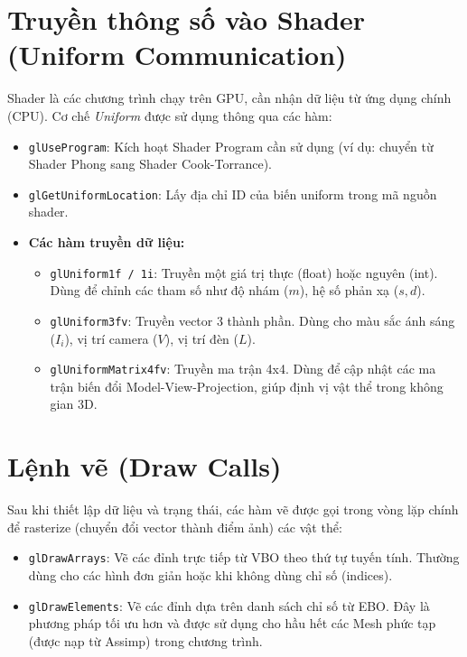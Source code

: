 \section{Truyền thông số vào Shader (Uniform Communication)}

Shader là các chương trình chạy trên GPU, cần nhận dữ liệu từ ứng dụng chính (CPU). Cơ chế \textit{Uniform} được sử dụng thông qua các hàm:

\begin{itemize}
	\item \texttt{glUseProgram}: Kích hoạt Shader Program cần sử dụng (ví dụ: chuyển từ Shader Phong sang Shader Cook-Torrance).
	\item \texttt{glGetUniformLocation}: Lấy địa chỉ ID của biến uniform trong mã nguồn shader.
	\item \textbf{Các hàm truyền dữ liệu:}
	\begin{itemize}
		\item \texttt{glUniform1f / 1i}: Truyền một giá trị thực (float) hoặc nguyên (int). Dùng để chỉnh các tham số như độ nhám ($m$), hệ số phản xạ ($s, d$).
		\item \texttt{glUniform3fv}: Truyền vector 3 thành phần. Dùng cho màu sắc ánh sáng ($I_i$), vị trí camera ($V$), vị trí đèn ($L$).
		\item \texttt{glUniformMatrix4fv}: Truyền ma trận 4x4. Dùng để cập nhật các ma trận biến đổi Model-View-Projection, giúp định vị vật thể trong không gian 3D.
	\end{itemize}
\end{itemize}

\section{Lệnh vẽ (Draw Calls)}

Sau khi thiết lập dữ liệu và trạng thái, các hàm vẽ được gọi trong vòng lặp chính để rasterize (chuyển đổi vector thành điểm ảnh) các vật thể:

\begin{itemize}
	\item \texttt{glDrawArrays}: Vẽ các đỉnh trực tiếp từ VBO theo thứ tự tuyến tính. Thường dùng cho các hình đơn giản hoặc khi không dùng chỉ số (indices).
	\item \texttt{glDrawElements}: Vẽ các đỉnh dựa trên danh sách chỉ số từ EBO. Đây là phương pháp tối ưu hơn và được sử dụng cho hầu hết các Mesh phức tạp (được nạp từ Assimp) trong chương trình.
\end{itemize}

